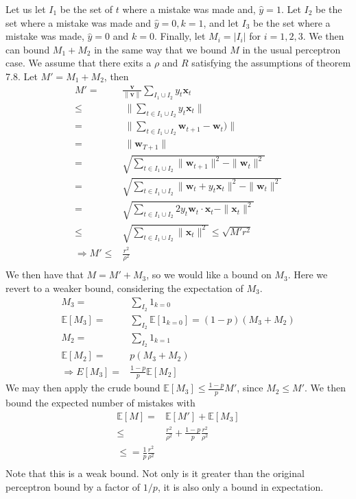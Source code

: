 \documentclass{article}
\newcommand{\V}[1]{\boldsymbol{#1}}
\newcommand{\E}[0]{\mathbb{E}}
\begin{document}
Let us let $I_1$ be the set of $t$ where a mistake was made and,
$\hat{y}=1$.  Let $I_2$ be the set where a mistake was made and
$\hat{y} = 0, k = 1$, and let $I_3$ be the set where a mistake was
made, $\hat{y} = 0$ and $k = 0$. Finally, let $M_i = |I_i|$ for $i =
1,2,3$. We then can bound $M_1 + M_2$ in the same way that we bound
$M$ in the usual perceptron case.  We assume that there exits a $\rho$
and $R$ satisfying the assumptions of theorem 7.8. Let $M' = M_1 + M_2$, then
\begin{align*}
M' =& \frac{\V{v}}{\|\V{v}\|}\sum_{I_1 \cup I_2}
y_t\V{x}_t \\
 \leq & \  \|\sum_{t \in I_1 \cup I_2} y_t \V{x}_t \|\\
= & \ \|\sum_{t \in I_1 \cup I_2} \V{w}_{t+1} - \V{w}_t) \| \\
= & \ \|\V{w}_{T+1} \| \\
= & \sqrt{\sum_{t \in I_1 \cup I_2} \|  \V{w}_{t+1}\|^2 -
  \|\V{w}_t\|^2 }\\
= & \sqrt{\sum_{t \in I_1 \cup I_2} \|  \V{w}_{t} + y_t\V{x}_t\|^2 -
  \|\V{w}_t\|^2 }\\
= & \sqrt{\sum_{t \in I_1 \cup I_2} 2y_t\V{w}_t\cdot \V{x}_t -
  \|\V{x}_t\|^2} \\
\leq & \sqrt{\sum_{t \in I_1 \cup I_2} \|\V{x}_t\|^2} \leq
\sqrt{M'r^2} \\
\Rightarrow M' \leq &\frac{r^2}{\rho^2} \\
\end{align*}
We then have that $M = M' + M_3$, so we would like a bound on $M_3$.
Here we revert to a weaker bound, considering the expectation of
$M_3$.  
\begin{align*}
M_3 = & \sum_{I_2} 1_{k = 0} \\
\E[M_3] = & \sum_{I_2} \E[1_{k = 0}] = (1 - p) (M_3 + M_2) \\
M_2 = & \sum_{I_2} 1_{k = 1} \\
\E[M_2] = & p (M_3 + M_2) \\
\Rightarrow E[M_3] = & \frac{1-p}{p}\E[M_2]
\end{align*}
We may then apply the crude bound $\E[M_3] \leq  \frac{1-p}{p}
M'$, since $M_2 \leq M'$. We then bound the expected number of mistakes with
\begin{align*}
\E[M]  =  & \E[M'] + \E[M_3] \\
\leq & \frac{r^2}{\rho^2} + \frac{1-p}{p}\frac{r^2}{\rho^2} \\
\leq = \frac{1}{p}\frac{r^2}{\rho^2} \\
\end{align*}
Note that this is a weak bound.  Not only is it greater than the
original perceptron bound by a factor of $1/p$, it is also only a
bound in expectation.
\end{document}
